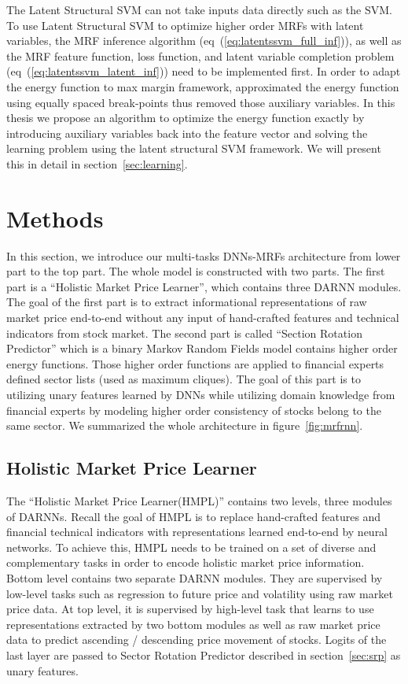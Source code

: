 \documentclass[sigconf, anonymous, review]{acmart}
\renewcommand{\citename}{\citet}
\renewcommand{\cite}{\citep}
\begin{document}
The Latent Structural SVM can not take inputs data directly such
as the SVM. To use Latent Structural SVM to optimize higher order
MRFs with latent variables, the MRF inference algorithm
(eq~(\ref{eq:latentssvm_full_inf})), as well as the MRF feature
function, loss function, and latent variable completion problem
(eq~(\ref{eq:latentssvm_latent_inf})) need to be implemented
first. In order to adapt the energy function to max margin
framework, \citename{Gould:ICML2011} approximated the energy
function using equally spaced break-points thus removed those
auxiliary variables. In this thesis we propose an algorithm to
optimize the energy function exactly by introducing auxiliary
variables back into the feature vector and solving the learning
problem using the latent structural SVM framework. We will
present this in detail in section~\ref{sec:learning}.

\section{Methods}
\label{sec:meth}

In this section, we introduce our multi-tasks DNNs-MRFs
architecture from lower part to the top part. The whole model is
constructed with two parts. The first part is a ``Holistic Market
Price Learner'', which contains three DARNN modules. The goal of
the first part is to extract informational representations of raw
market price end-to-end without any input of hand-crafted
features and technical indicators from stock market. The second
part is called ``Section Rotation Predictor'' which is a binary
Markov Random Fields model contains higher order energy
functions. Those higher order functions are applied to financial
experts defined sector lists (used as maximum cliques). The goal
of this part is to utilizing unary features learned by DNNs while
utilizing domain knowledge from financial experts by modeling
higher order consistency of stocks belong to the same sector. We
summarized the whole architecture in figure~\ref{fig:mrfrnn}.


\subsection{Holistic Market Price Learner}
\label{sec:hmpl}

The ``Holistic Market Price Learner(HMPL)'' contains two levels,
three modules of DARNNs\cite{qin2017dual}. Recall the goal of
HMPL is to replace hand-crafted features and financial technical
indicators with representations learned end-to-end by neural
networks. To achieve this, HMPL needs to be trained on a set of
diverse and complementary tasks in order to encode holistic
market price information. Bottom level contains two separate
DARNN modules. They are supervised by low-level tasks such as
regression to future price and volatility using raw market price
data. At top level, it is supervised by high-level task that
learns to use representations extracted by two bottom modules as
well as raw market price data to predict ascending / descending
price movement of stocks. Logits of the last layer are passed to
Sector Rotation Predictor described in section~\ref{sec:srp} as
unary features.
\end{document}
